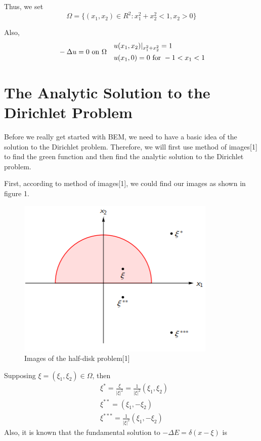 \documentclass[a4paper,12pt]{article}
\begin{document}
\par Thus, we set
\begin{equation}
\Omega = \{ (x_1,x_2) \in R^2: x_1^2 + x_2^2 < 1, x_2 > 0 \}
\end{equation}

\par Also,
\begin{align}
&- \Delta u = 0 \ {\rm on}\   \Omega & \begin{aligned}
&u(x_1,x_2)|_{x_1^2 + x_2^2} = 1 \\ &u(x_1,0) = 0  \ {\rm for} \ -1 < x_1 < 1
\end{aligned}
\end{align} 

\section{The Analytic Solution to the Dirichlet Problem}
Before we really get started with BEM, we need to have a basic idea of the solution to the Dirichlet problem. Therefore, we will first use method of images[1] to find the green function and then find the analytic solution to the Dirichlet problem. 

\par First, according to method of images[1], we could find our images as shown in figure 1.
\begin{figure}[H]
\centering
\includegraphics[scale=0.7]{1.png}
\caption{Images of the half-disk problem[1]}
\end{figure}
\noindent Supposing $\xi = (\xi_1, \xi_2) \in \Omega$, then
\begin{equation*}
\begin{aligned}
&\xi^* = \frac{\xi}{|\xi|^2} = \frac{1}{|\xi|^2}(\xi_1, \xi_2)\\
&\xi^{**} = (\xi_1 , - \xi_2) \\
&\xi^{***} = \frac{1}{|\xi|^2}(\xi_1, -\xi_2)
\end{aligned}
\end{equation*}
Also, it is known that the fundamental solution to $-\Delta E = \delta(x - \xi)$ is
\end{document}

